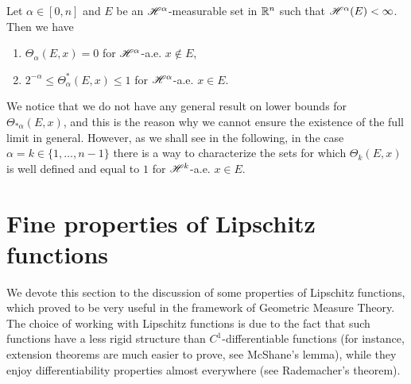 \begin{proposition}
Let $\alpha \in [0, n]$ and $E$ be an $\mathscr{H}^{\alpha}$-measurable set in $\mathbb{R}^{n}$ such that $\mathscr{H}^{\alpha}(E) < \infty$. Then we have
\begin{enumerate}
\item $\Theta_{\alpha}(E, x) = 0$ for $\mathscr{H}^{\alpha}$-a.e. $x \notin E$,
\item $2^{-\alpha} \le \Theta^{*}_{\alpha}(E, x) \le 1$ for $\mathscr{H}^{\alpha}$-a.e. $x \in E$.
\end{enumerate}
\end{proposition}

We notice that we do not have any general result on lower bounds for $\Theta_{* \alpha}(E, x)$, and this is the reason why we cannot ensure the existence of the full limit in general. However, as we shall see in the following, in the case $\alpha = k \in \{1, \dots, n - 1\}$ there is a way to characterize the sets for which $\Theta_{k}(E, x)$ is well defined and equal to $1$ for $\mathscr{H}^{k}$-a.e. $x \in E$.

\section{Fine properties of Lipschitz functions}

We devote this section to the discussion of some properties of Lipschitz functions, which proved to be very useful in the framework of Geometric Measure Theory. 
The choice of working with Lipschitz functions is due to the fact that such functions have a less rigid structure than $C^{1}$-differentiable functions (for instance, extension theorems are much easier to prove, see McShane's lemma), while they enjoy differentiability properties almost everywhere (see Rademacher's theorem).

